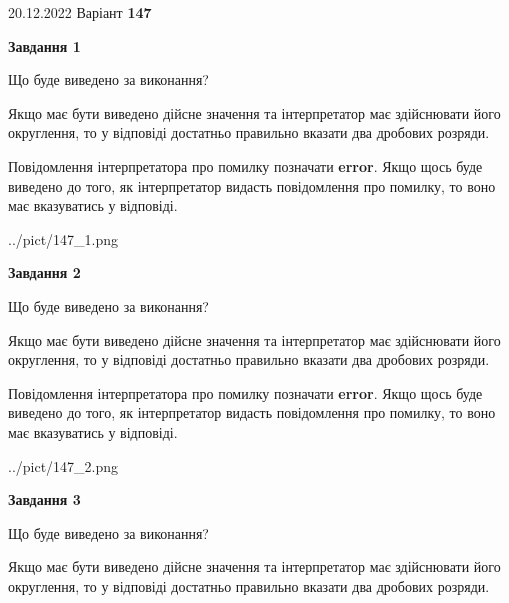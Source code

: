 \documentclass[12pt, ukrainian]{article}
\begin{document}
{20.12.2022 Варіант \No \textbf { 147 }\par}
{
\begin {Large}

{\begin {center}\textbf{Завдання 1}\end {center}}\par
Що буде виведено за виконання? \par

Якщо має бути виведено дійсне значення та інтерпретатор має здійснювати його округлення, 
то у відповіді достатньо правильно вказати два дробових розряди.

Повідомлення інтерпретатора про помилку позначати \textbf{error}.
Якщо щось буде виведено до того, як інтерпретатор видасть повідомлення про помилку, 
то воно має вказуватись у відповіді. \par

\begin{center}
	{../pict/147_1.png}
\end{center}
\newpage

{\begin {center}\textbf{Завдання 2}\end {center}}\par
Що буде виведено за виконання? \par

Якщо має бути виведено дійсне значення та інтерпретатор має здійснювати його округлення, 
то у відповіді достатньо правильно вказати два дробових розряди.

Повідомлення інтерпретатора про помилку позначати \textbf{error}.
Якщо щось буде виведено до того, як інтерпретатор видасть повідомлення про помилку, 
то воно має вказуватись у відповіді. \par

\begin{center}
	{../pict/147_2.png}
\end{center}
\newpage

{\begin {center}\textbf{Завдання 3}\end {center}}\par
Що буде виведено за виконання? \par

Якщо має бути виведено дійсне значення та інтерпретатор має здійснювати його округлення, 
то у відповіді достатньо правильно вказати два дробових розряди.


\end{Large}}
\end{document}
